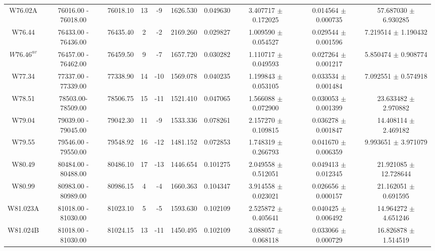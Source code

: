 \documentclass{article}
\begin{document}
\begin{table}[h]
{\begin{tabular}{|c|c|c|c|c|c|c|c|c|c|}
W76.02A & 76016.00 - 76018.00 & 76018.10 & 13 & -9 & 1626.530 & 0.049630 & 3.407717 $\pm$ 0.172025 & 0.014564 $\pm$ 0.000735 & 57.687030 $\pm$ 6.930285 \\

W76.44 & 76433.00 - 76436.00 & 76435.40 & 2 & -2 & 2169.260 & 0.029827 & 1.009590 $\pm$ 0.054527 & 0.029544 $\pm$ 0.001596 & 7.219514 $\pm$ 1.190432 \\
    
$W76.46^{av}$ & 76457.00 - 76462.00 & 76459.50 & 9 & -7 & 1657.720 & 0.030282 & 1.110717 $\pm$ 0.049593 & 0.027264 $\pm$ 0.001217 & 5.850474 $\pm$ 0.908774 \\
         
W77.34 & 77337.00 - 77339.00 & 77338.90 & 14 & -10 & 1569.078 & 0.040235 & 1.199843 $\pm$ 0.053105 & 0.033534 $\pm$ 0.001484 & 7.092551 $\pm$ 0.574918 \\

W78.51 & 78503.00-78509.00 &                78506.75 &   15 &  -11 &          1521.410 & 0.047065 &   1.566088 $\pm$ 0.072900 & 0.030053 $\pm$ 0.001399 & 23.633482 $\pm$ 2.970882 \\

W79.04 & 79039.00 - 79045.00 & 79042.30 & 11 & -9 & 1533.336 & 0.078261 & 2.157270 $\pm$ 0.109815 & 0.036278 $\pm$ 0.001847 & 14.408114 $\pm$ 2.469182 \\
         
W79.55 & 79546.00 - 79550.00 & 79548.92 & 16 & -12 & 1481.152 & 0.072853 & 1.748319 $\pm$ 0.266793 &  0.041670 $\pm$ 0.006359 & 9.993651 $\pm$ 3.971079 \\
         
W80.49 & 80484.00 - 80488.00 & 80486.10 & 17 & -13 & 1446.654 & 0.101275 & 2.049558 $\pm$ 0.512051 & 0.049413 $\pm$ 0.012345 & 21.921085 $\pm$ 12.728644 \\

W80.99 & 80983.00 - 80989.00 & 80986.15 & 4 & -4 & 1660.363 & 0.104347 & 3.914558 $\pm$ 0.023021 & 0.026656 $\pm$ 0.000157 & 21.162051 $\pm$ 0.691595 \\

W81.023A & 81018.00 - 81030.00 & 81023.10 & 5 & -5 & 1593.630 & 0.102109 & 2.525872 $\pm$ 0.405641 & 0.040425 $\pm$ 0.006492 & 14.964272 $\pm$ 4.651246 \\

W81.024B & 81018.00 - 81030.00 & 81024.15 & 13 & -11 & 1450.495 & 0.102109 & 3.088057 $\pm$ 0.068118 & 0.033066 $\pm$ 0.000729 & 16.826878 $\pm$ 1.514519 \\


\end{tabular}}
\end{table}
\end{document}
